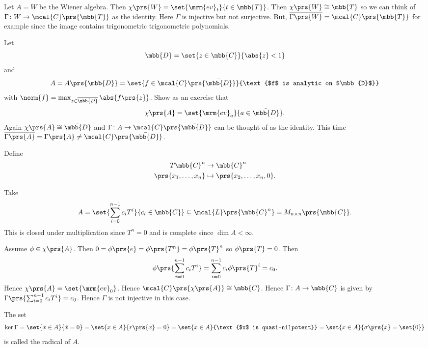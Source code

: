 \documentclass[10pt, twoside]{book}
\begin{document}
\begin{example}
Let $A = W$ be the Wiener algebra. Then $\chi\prs{W} = \set{\mrm{ev}_t}{t \in \mbb{T}}$. Then $\chi\prs{W} \cong \mbb{T}$ so we can think of $\Gamma \colon W \to \mcal{C}\prs{\mbb{T}}$ as the identity. Here $\Gamma$ is injective but not surjective. But, $\overline{\Gamma\prs{W}} = \mcal{C}\prs{\mbb{T}}$ for example since the image contains trigonometric trigonometric polynomials.
\end{example}

\begin{example}
Let
\[\mbb{D} = \set{z \in \mbb{C}}{\abs{z} < 1}\]
and
\[A = A\prs{\mbb{D}} = \set{f \in \mcal{C}\prs{\bar{\mbb{D}}}}{\text{$f$ is analytic on $\mbb{D}$}}\]
with
$\norm{f} = \max_{z \in \overline{\mbb{D}}} \abs{f\prs{z}}$.
Show as an exercise that
\[\chi\prs{A} = \set{\mrm{ev}_a}{a \in \bar{\mbb{D}}} \text{.}\]
Again $\chi\prs{A} \cong \bar{\mbb{D}}$ and $\Gamma \colon A \to \mcal{C}\prs{\bar{\mbb{D}}}$ can be thought of as the identity. This time $\overline{\Gamma\prs{A}} = \Gamma\prs{A} \neq \mcal{C}\prs{\bar{\mbb{D}}}$. 
\end{example}

\begin{example}
Define
\begin{align*}
T \mbb{C}^n &\to \mbb{C}^n \\
\prs{x_1, \ldots, x_n} &\mapsto \prs{x_2, \ldots, x_n, 0} \text{.}
\end{align*}

Take
\[A = \set{\sum_{i=0}^{n-1} c_i T^i}{c_i \in \mbb{C}} \subseteq \mcal{L}\prs{\mbb{C}^n} = M_{n \times n}\prs{\mbb{C}} \text{.}\]
This is closed under multiplication since $T^n = 0$ and is complete since $\dim A < \infty$.

Assume $\phi \in \chi\prs{A}$. Then $0 = \phi\prs{e} = \phi\prs{T^n} = \phi\prs{T}^n$ so $\phi\prs{T} = 0$. Then
\[\phi\prs{\sum_{i=0}^{n-1} c_i T^i} = \sum_{i = 0}^{n-1} c_i \phi\prs{T}^i = c_0 \text{.}\]
Hence $\chi\prs{A} = \set{\mrm{ev}_0}$. Hence $\mcal{C}\prs{\chi\prs{A}} \cong \mbb{C}$.
Hence
$\Gamma \colon A \to \mbb{C}$ is given by $\Gamma\prs{\sum_{i=0}^{n-1} c_i T^i} = c_0$. Hence $\Gamma$ is not injective in this case.
\end{example}

\begin{definition}
The set
\[\ker \Gamma = \set{x \in A}{\hat{x} = 0} = \set{x \in A}{r\prs{x} = 0} = \set{x \in A}{\text{$x$ is quasi-nilpotent}} = \set{x \in A}{\sigma\prs{x} = \set{0}}\]
is called the radical of $A$.
\end{definition}
\end{document}
